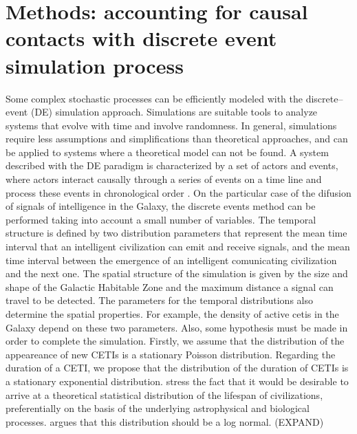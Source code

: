 \documentclass[crop]{CSLB}%
\begin{document}



\section{Methods: accounting for causal contacts with 
discrete event simulation process}\label{S_methods}

Some complex stochastic processes can be efficiently modeled with the
discrete--event (DE) simulation approach.
%
Simulations are suitable tools to analyze systems that evolve with
time and involve randomness.
%
In general, simulations require less assumptions and simplifications
than theoretical approaches, and can be applied to systems where a
theoretical model can not be found.
%
A system described with the DE paradigm is characterized by a set of
actors and events, where actors interact causally through a series of
events on a time line and process these events in chronological order
\citep{ptolemaeus_system_2014, chung_simulation_2003,
simulation_ross_2012}.
%
On the particular case of the difusion of signals of intelligence in
the Galaxy, the discrete events method can be performed taking into
account a small number of variables.
%
The temporal structure is defined by two distribution parameters that
represent the mean time interval that an intelligent civilization can
emit and receive signals, and the mean time interval between the
emergence of an intelligent comunicating civilization and the next
one.
%
The spatial structure of the simulation is given by the size and shape
of the Galactic Habitable Zone and the maximum distance a signal can
travel to be detected.
%
The parameters for the temporal distributions also determine the
spatial properties.
%
For example, the density of active cetis in the Galaxy depend on these
two parameters.
%
Also, some hypothesis must be made in order to complete the
simulation.
%
Firstly, we assume that the distribution of the appeareance of new
CETIs is a stationary Poisson distribution.
%
Regarding the duration of a CETI, we propose that the distribution of
the duration of CETIs is a stationary exponential distribution.
%
\citet{Balbi2018} stress the fact that it would be desirable to arrive
at a theoretical statistical distribution of the lifespan of
civilizations, preferentially on the basis of the underlying
astrophysical and biological processes.
%
\citet{Maccone} argues that this distribution should be a log normal.
(EXPAND)
\end{document}
